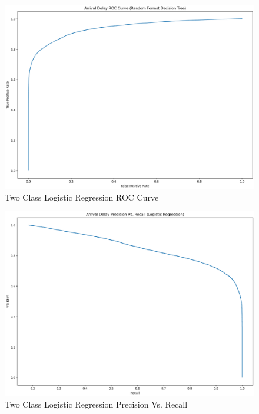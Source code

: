 \documentclass[a4paper,12pt]{article}
\begin{document}
\begin{figure}
    \centering
    \includegraphics*[scale=.45]{../../img/model_rq1_roc.png}
    \caption[]{Two Class Logistic Regression ROC Curve}
    \label{fig:model:rq1:ROC}
\end{figure}

\begin{figure}
    \centering
    \includegraphics*[scale=.45]{../../img/model_rq1_prec_recall.png}
    \caption[]{Two Class Logistic Regression Precision Vs. Recall}
    \label{fig:model:rq1:prec_recall}
\end{figure}
\end{document}
